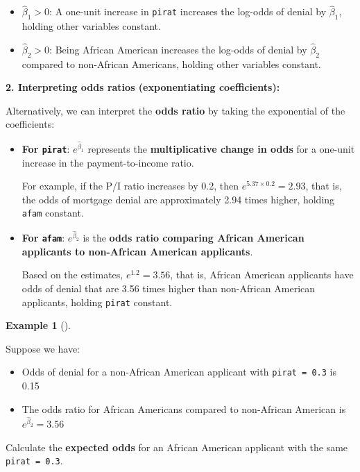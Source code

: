 \documentclass[
  12pt,
  letterpaper,
]{scrbook}
\providecommand{\tightlist}{%
  \setlength{\itemsep}{0pt}\setlength{\parskip}{0pt}}
\renewcommand{\tightlist}{\setlength{\itemsep}{0.5\baselineskip}\setlength{\parskip}{0.2\baselineskip}}
\theoremstyle{definition}
\newtheorem{example}{Example}[chapter]
\theoremstyle{plain}
\theoremstyle{remark}
\begin{document}
\begin{itemize}
\tightlist
\item
  \(\hat{\beta}_1 > 0\): A one-unit increase in \texttt{pirat} increases
  the log-odds of denial by \(\hat{\beta}_1\), holding other variables
  constant.
\item
  \(\hat{\beta}_2 > 0\): Being African American increases the log-odds
  of denial by \(\hat{\beta}_2\) compared to non-African Americans,
  holding other variables constant.
\end{itemize}

\textbf{2. Interpreting odds ratios (exponentiating coefficients):}

Alternatively, we can interpret the \textbf{odds ratio} by taking the
exponential of the coefficients:

\begin{itemize}
\item
  \textbf{For \texttt{pirat}}: \(e^{\hat{\beta}_1}\) represents the
  \textbf{multiplicative change in odds} for a one-unit increase in the
  payment-to-income ratio.

  For example, if the P/I ratio increases by 0.2, then
  \(e^{5.37\times 0.2} = 2.93\), that is, the odds of mortgage denial
  are approximately 2.94 times higher, holding \texttt{afam} constant.
\item
  \textbf{For \texttt{afam}}: \(e^{\hat{\beta}_2}\) is the \textbf{odds
  ratio comparing African American applicants to non-African American
  applicants}.

  Based on the estimates, \(e^{1.2} = 3.56\), that is, African American
  applicants have odds of denial that are 3.56 times higher than
  non-African American applicants, holding \texttt{pirat} constant.
\end{itemize}

\begin{example}[]\protect\hypertarget{exm-2}{}\label{exm-2}

Suppose we have:

\begin{itemize}
\tightlist
\item
  Odds of denial for a non-African American applicant with
  \texttt{pirat\ =\ 0.3} is 0.15
\item
  The odds ratio for African Americans compared to non-African American
  is \(e^{\hat{\beta}_2} = 3.56\)
\end{itemize}

Calculate the \textbf{expected odds} for an African American applicant
with the same \texttt{pirat\ =\ 0.3}.

\end{example}
\end{document}
